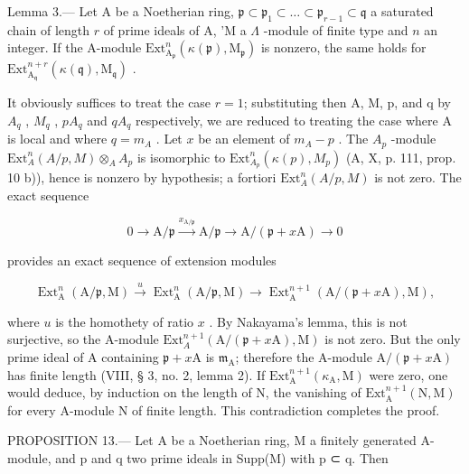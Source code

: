 Lemma 3.--- Let A be a Noetherian ring, \(\mathfrak{p} \subset \mathfrak{p}_1 \subset \ldots \subset \mathfrak{p}_{r-1} \subset \mathfrak{q}\) a saturated chain of length \(r\) of prime ideals of A, 'M a \(\Lambda\) -module of finite type and \(n\) an integer. If the A-module \(\mathrm{Ext}_{\mathrm{A}_{\mathfrak{p}}}^{n}(\kappa(\mathfrak{p}), \mathrm{M}_{\mathfrak{p}})\) is nonzero, the same holds for \(\mathrm{Ext}_{\mathrm{A}_{\mathfrak{q}}}^{n+r}(\kappa(\mathfrak{q}), \mathrm{M}_{\mathfrak{q}})\) .

It obviously suffices to treat the case \(r = 1\); substituting then A, M, p, and q by \(A_q\) , \(M_q\) , \(pA_q\) and \(qA_q\) respectively, we are reduced to treating the case where A is local and where \(q = m_A\) . Let \(x\) be an element of \(m_A - p\) . The \(A_p\) -module \(\text{Ext}_A^n(A/p, M) \otimes_A A_p\) is isomorphic to \(\text{Ext}_{A_p}^n(\kappa(p), M_p)\) (A, X, p. 111, prop. 10 b)), hence is nonzero by hypothesis; a fortiori \(\text{Ext}_A^n(A/p, M)\) is not zero. The exact sequence

\[
0 \rightarrow \mathrm{A} / \mathfrak {p} \stackrel {{x _ {\mathrm{A} / \mathfrak {p}}}} {{\longrightarrow}} \mathrm{A} / \mathfrak {p} \longrightarrow \mathrm{A} / (\mathfrak {p} + x \mathrm{A}) \rightarrow 0
\]

provides an exact sequence of extension modules

\[
\operatorname{Ext} _ {\mathrm{A}} ^ {n} (\mathrm{A} / \mathfrak {p}, \mathrm{M}) \xrightarrow {u} \operatorname{Ext} _ {\mathrm{A}} ^ {n} (\mathrm{A} / \mathfrak {p}, \mathrm{M}) \longrightarrow \operatorname{Ext} _ {\mathrm{A}} ^ {n + 1} (\mathrm{A} / (\mathfrak {p} + x \mathrm{A}), \mathrm{M}),
\]

where \(u\) is the homothety of ratio \(x\) . By Nakayama's lemma, this is not surjective, so the A-module \(\text{Ext}_A^{n+1}(\text{A}/(\mathfrak{p} + x\text{A}), \text{M})\) is not zero. But the only prime ideal of A containing \(\mathfrak{p} + x\text{A}\) is \(\mathfrak{m}_\text{A}\); therefore the A-module \(\text{A}/(\mathfrak{p} + x\text{A})\) has finite length (VIII, § 3, no. 2, lemma 2). If \(\text{Ext}_\text{A}^{n+1}(\kappa_\text{A}, \text{M})\) were zero, one would deduce, by induction on the length of N, the vanishing of \(\text{Ext}_\text{A}^{n+1}(\text{N}, \text{M})\) for every A-module N of finite length. This contradiction completes the proof.

PROPOSITION 13.--- Let A be a Noetherian ring, M a finitely generated A-module, and p and q two prime ideals in Supp(M) with p ⊂ q. Then

